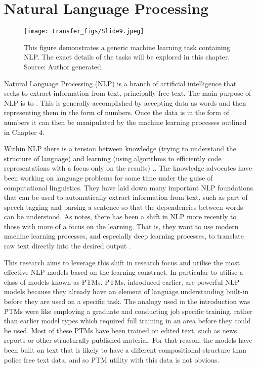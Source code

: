 \chapter{Natural Language Processing}

\begin{figure}
  \texttt{[image: transfer\_figs/Slide9.jpeg]}
  \caption[NLP process Overview.]{This figure demonstrates a generic machine learning task containing NLP. The exact details of the tasks will be explored in this chapter. Source: Author generated}
  \label{fig:overview}
\end{figure}

Natural Language Processing (NLP) is a branch of artificial intelligence that seeks to extract information from text, principally free text. The main purpose of NLP is to  \parencite{eisenstein2018natural}. This is generally accomplished by accepting data as words and then representing them in the form of numbers. Once the data is in the form of numbers it can then be manipulated by the machine learning processes outlined in Chapter 4.


Within NLP there is a tension between knowledge (trying to understand the structure of language) and learning (using algorithms to efficiently code representations with a focus only on the results) \parencite{eisenstein2018natural}.. The knowledge advocates have been working on language problems for some time under the guise of computational linguistics. They have laid down many important NLP foundations that can be used to automatically extract information from text, such as part of speech tagging and parsing a sentence so that the dependencies between words can be understood. As \textcite{manning2015computational} notes, there has been a shift in NLP more recently to those with more of a focus on the learning. That is, they want to use modern machine learning processes, and especially deep learning processes, to translate raw text directly into the desired output \parencite{eisenstein2018natural}.

This research aims to leverage this shift in research focus and utilise the most effective NLP models based on the learning construct. In particular to utilise a class of models known as PTMs. PTMs, introduced earlier, are powerful NLP models  because they already have an element of language understanding built-in before they are used on a specific task. The analogy used in the introduction was PTMs were like employing a graduate and conducting job specific  training, rather than earlier model types which required full training in an area before they could be used. Most of these PTMs have been trained on edited text, such as news reports or other structurally published material. For that reason, the models have been built on text that is likely to have a different compositional structure than police free text data, and so PTM utility with this data is not obvious.

